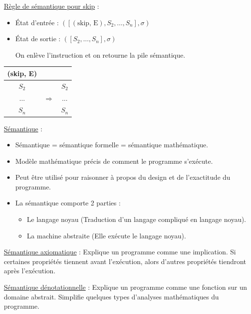 \documentclass[fr,license=none]{../../../eplsummary}
\begin{document}
\begin{flushleft}
\textcolor{mauvedef}{\underline{Règle de sémantique pour skip}} :

\begin{itemize}
\item État d'entrée : \textcolor{miorangerouge}{$([(\text{skip, E}), S_2, \ldots , S_n ], \sigma )$}
\item État de sortie : \textcolor{miorangerouge}{$([S_2, \ldots , S_n ], \sigma )$}

On enlève l'instruction et on retourne la pile sémantique.
\end{itemize}\bigbreak

\begin{center}
\begin{tabular}{|c|c|c|}
(skip, E) & & \\
\hline
$S_2$ & & $S_2$\\
\hline
$\ldots$ & $\Rightarrow$ & $\ldots$\\
\hline
$S_n$ & & $S_n$\\
\hline
\end{tabular}
\end{center}
\bigbreak



\textcolor{mauvedef}{\underline{Sémantique}} :
\begin{itemize}
\item Sémantique = sémantique formelle = sémantique mathématique.
\item Modèle mathématique précis de comment le programme s'exécute.
\item Peut être utilisé pour raisonner à propos du design et de l'exactitude du programme.
\item La sémantique comporte 2 parties :
\begin{itemize}[label=\textbullet, font=\MEDIUM]
\item Le langage noyau (Traduction d'un langage compliqué en langage noyau).
\item La machine abstraite (Elle exécute le langage noyau).
\end{itemize}
\end{itemize}\bigbreak

\textcolor{mauvedef}{\underline{Sémantique axiomatique}} : Explique un programme comme une implication. Si certaines propriétés tiennent avant l'exécution, alors d'autres propriétés tiendront après l'exécution. \bigbreak

\textcolor{mauvedef}{\underline{Sémantique dénotationnelle}} : Explique un programme comme une fonction sur un domaine abstrait. Simplifie quelques types d'analyses mathématiques du programme. \bigbreak


\end{flushleft}
\end{document}
